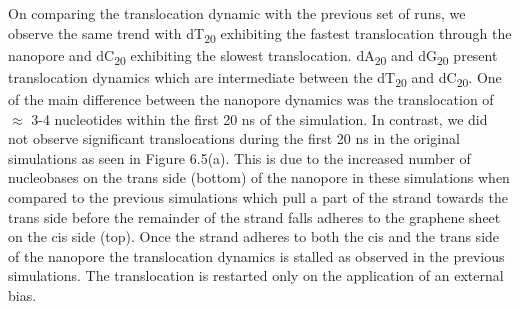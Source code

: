 On comparing the translocation dynamic with the previous set of runs, we observe the same trend with dT\textsubscript{20} exhibiting the fastest translocation through the nanopore and dC\textsubscript{20} exhibiting the slowest translocation. dA\textsubscript{20} and dG\textsubscript{20} present translocation dynamics which are intermediate between the dT\textsubscript{20} and dC\textsubscript{20}. One of the main difference between the nanopore dynamics was the translocation of $\approx$ 3-4 nucleotides within the first 20 ns of the simulation. In contrast, we did not observe significant translocations during the first 20 ns in the original simulations as seen in Figure 6.5(a). This is due to the increased number of nucleobases on the trans side (bottom) of the nanopore in these simulations when compared to the previous simulations which pull a part of the strand towards the trans side before the remainder of the strand falls adheres to the graphene sheet on the cis side (top). Once the strand adheres to both the cis and the trans side of the nanopore the translocation dynamics is stalled as observed in the previous simulations. The translocation is restarted only on the application of an external bias. 

